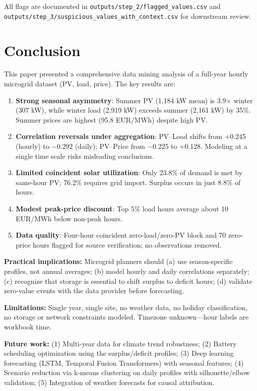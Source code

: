 \documentclass[conference]{IEEEtran}
\begin{document}
All flags are documented in \texttt{outputs/step\_2/flagged\_values.csv} and \texttt{outputs/step\_3/suspicious\_values\_with\_context.csv} for downstream review.

\section{Conclusion}
\label{sec:conclusion}

This paper presented a comprehensive data mining analysis of a full-year hourly microgrid dataset (PV, load, price). The key results are:

\begin{enumerate}
    \item \textbf{Strong seasonal asymmetry}: Summer PV (1,184 kW mean) is 3.9$\times$ winter (307 kW), while winter load (2,919 kW) exceeds summer (2,161 kW) by 35\%. Summer prices are highest (95.8 EUR/MWh) despite high PV.
    \item \textbf{Correlation reversals under aggregation}: PV–Load shifts from +0.245 (hourly) to $-$0.292 (daily); PV–Price from $-$0.225 to +0.128. Modeling at a single time scale risks misleading conclusions.
    \item \textbf{Limited coincident solar utilization}: Only 23.8\% of demand is met by same-hour PV; 76.2\% requires grid import. Surplus occurs in just 8.8\% of hours.
    \item \textbf{Modest peak-price discount}: Top 5\% load hours average about 10 EUR/MWh below non-peak hours.
    \item \textbf{Data quality}: Four-hour coincident zero-load/zero-PV block and 70 zero-price hours flagged for source verification; no observations removed.
\end{enumerate}

\textbf{Practical implications:} Microgrid planners should (a) use season-specific profiles, not annual averages; (b) model hourly and daily correlations separately; (c) recognize that storage is essential to shift surplus to deficit hours; (d) validate zero-value events with the data provider before forecasting.

\textbf{Limitations:} Single year, single site, no weather data, no holiday classification, no storage or network constraints modeled. Timezone unknown—hour labels are workbook time.

\textbf{Future work:} (1) Multi-year data for climate trend robustness; (2) Battery scheduling optimization using the surplus/deficit profiles; (3) Deep learning forecasting (LSTM, Temporal Fusion Transformers) with seasonal features; (4) Scenario reduction via k-means clustering on daily profiles with silhouette/elbow validation; (5) Integration of weather forecasts for causal attribution.
\end{document}
